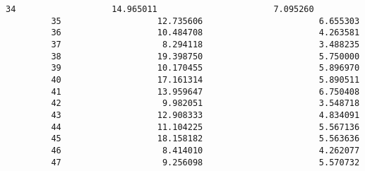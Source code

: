 \documentclass[11pt]{article}
\begin{document}
\begin{Verbatim}[commandchars=\\\{\}]
         34                   14.965011                       7.095260   
         35                   12.735606                       6.655303   
         36                   10.484708                       4.263581   
         37                    8.294118                       3.488235   
         38                   19.398750                       5.750000   
         39                   10.170455                       5.896970   
         40                   17.161314                       5.890511   
         41                   13.959647                       6.750408   
         42                    9.982051                       3.548718   
         43                   12.908333                       4.834091   
         44                   11.104225                       5.567136   
         45                   18.158182                       5.563636   
         46                    8.414010                       4.262077   
         47                    9.256098                       5.570732   
         

\end{Verbatim}
\end{document}
